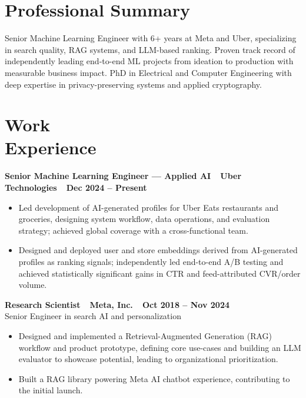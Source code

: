 \documentclass[line,margin]{res}
\begin{document}
\address{San Francisco Bay Area}
\address{650-665-0436. lhlich@gmail.com}

\begin{resume}

\section{Professional Summary}
Senior Machine Learning Engineer with 6+ years at Meta and Uber, specializing in search quality, RAG systems, and LLM-based ranking. Proven track record of independently leading end-to-end ML projects from ideation to production with measurable business impact. PhD in Electrical and Computer Engineering with deep expertise in privacy-preserving systems and applied cryptography.

\section{Work \\ Experience} 

\textbf{Senior Machine Learning Engineer --- Applied AI\ \textbar\ Uber Technologies\ \textbar\ Dec 2024 -- Present}
\begin{itemize}\itemsep -2pt
    \item Led development of AI-generated profiles for Uber Eats restaurants and groceries, designing system workflow, data operations, and evaluation strategy; achieved global coverage with a cross-functional team.
    \item Designed and deployed user and store embeddings derived from AI-generated profiles as ranking signals; independently led end-to-end A/B testing and achieved statistically significant gains in CTR and feed-attributed CVR/order volume.
\end{itemize}

\textbf{Research Scientist\ \textbar\ Meta, Inc.\ \textbar\ Oct 2018 -- Nov 2024}\\
Senior Engineer in search AI and personalization
\begin{itemize}\itemsep -2pt
    \item Designed and implemented a Retrieval-Augmented Generation (RAG) workflow and product prototype, defining core use-cases and building an LLM evaluator to showcase potential, leading to organizational prioritization.
    \item Built a RAG library powering Meta AI chatbot experience, contributing to the initial launch.


\end{itemize}
\end{resume}
\end{document}
